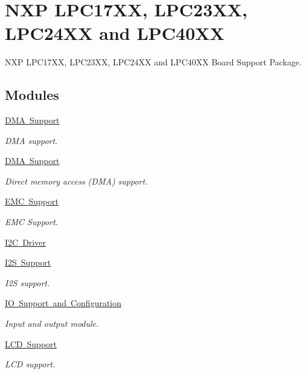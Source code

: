 \hypertarget{group__RTEMSBSPsARMLPC24XX}{}\section{N\+XP L\+P\+C17\+XX, L\+P\+C23\+XX, L\+P\+C24\+XX and L\+P\+C40\+XX}
\label{group__RTEMSBSPsARMLPC24XX}


N\+XP L\+P\+C17\+XX, L\+P\+C23\+XX, L\+P\+C24\+XX and L\+P\+C40\+XX Board Support Package.  


\subsection*{Modules}
\begin{DoxyCompactItemize}
\item 
\mbox{\hyperlink{group__lpc__dma}{D\+M\+A Support}}
\begin{DoxyCompactList}\small\item\em D\+MA support. \end{DoxyCompactList}\item 
\mbox{\hyperlink{group__lpc24xx__dma}{D\+M\+A Support}}
\begin{DoxyCompactList}\small\item\em Direct memory access (D\+MA) support. \end{DoxyCompactList}\item 
\mbox{\hyperlink{group__lpc__emc}{E\+M\+C Support}}
\begin{DoxyCompactList}\small\item\em E\+MC Support. \end{DoxyCompactList}\item 
\mbox{\hyperlink{group__RTEMSBSPsARMLPC24XXI2C}{I2\+C Driver}}
\item 
\mbox{\hyperlink{group__lpc__i2s}{I2\+S Support}}
\begin{DoxyCompactList}\small\item\em I2S support. \end{DoxyCompactList}\item 
\mbox{\hyperlink{group__lpc24xx__io}{I\+O Support and Configuration}}
\begin{DoxyCompactList}\small\item\em Input and output module. \end{DoxyCompactList}\item 
\mbox{\hyperlink{group__lpc__lcd}{L\+C\+D Support}}
\begin{DoxyCompactList}\small\item\em L\+CD support. \end{DoxyCompactList}\item 

\end{DoxyCompactItemize}
